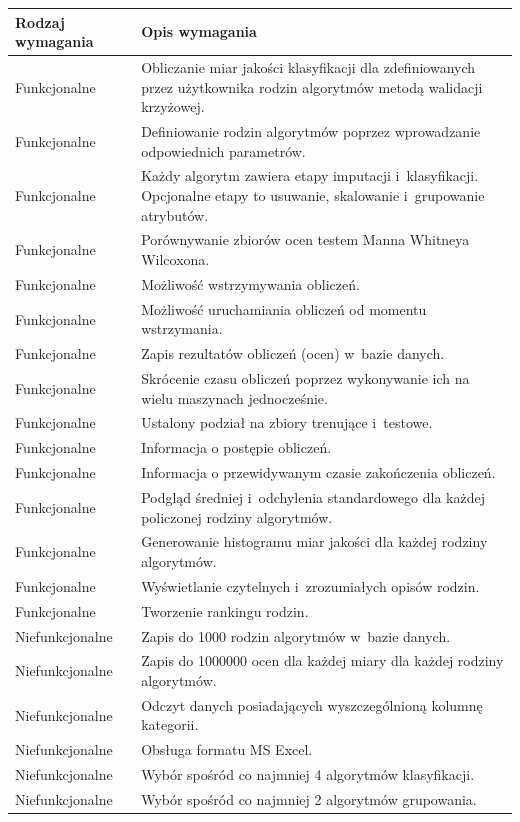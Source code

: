 \documentclass[../thesis.tex]{subfiles}
\begin{document}
\begin{table}[h]
\begin{center}
\begin{tabular}{ | l | p{110mm} | }
\hline
\rowcolor{lightgray} Rodzaj wymagania & Opis wymagania \\\hline

Funkcjonalne & Obliczanie miar jakości klasyfikacji dla zdefiniowanych przez użytkownika rodzin algorytmów metodą walidacji krzyżowej. \\\hline
Funkcjonalne & Definiowanie rodzin algorytmów poprzez wprowadzanie odpowiednich parametrów. \\\hline
Funkcjonalne & Każdy algorytm zawiera etapy imputacji i~klasyfikacji. Opcjonalne etapy to usuwanie, skalowanie i~grupowanie atrybutów. \\\hline
Funkcjonalne & Porównywanie zbiorów ocen testem Manna Whitneya Wilcoxona. \\\hline
Funkcjonalne & Możliwość wstrzymywania obliczeń. \\\hline
Funkcjonalne & Możliwość uruchamiania obliczeń od momentu wstrzymania. \\\hline
Funkcjonalne & Zapis rezultatów obliczeń (ocen) w~bazie danych. \\\hline
Funkcjonalne & Skrócenie czasu obliczeń poprzez wykonywanie ich na wielu maszynach jednocześnie. \\\hline
Funkcjonalne & Ustalony podział na zbiory trenujące i~testowe. \\\hline
Funkcjonalne & Informacja o postępie obliczeń. \\\hline
Funkcjonalne & Informacja o przewidywanym czasie zakończenia obliczeń. \\\hline
Funkcjonalne & Podgląd średniej i~odchylenia standardowego dla każdej policzonej rodziny algorytmów. \\\hline
Funkcjonalne & Generowanie histogramu miar jakości dla każdej rodziny algorytmów. \\\hline
Funkcjonalne & Wyświetlanie czytelnych i~zrozumiałych opisów rodzin. \\\hline
Funkcjonalne & Tworzenie rankingu rodzin. \\\hline

Niefunkcjonalne & Zapis do 1000 rodzin algorytmów w~bazie danych. \\\hline
Niefunkcjonalne & Zapis do 1000000 ocen dla każdej miary dla każdej rodziny algorytmów. \\\hline
Niefunkcjonalne & Odczyt danych posiadających wyszczególnioną kolumnę kategorii. \\\hline 
Niefunkcjonalne & Obsługa formatu MS Excel. \\\hline
Niefunkcjonalne & Wybór spośród co najmniej 4 algorytmów klasyfikacji. \\\hline 
Niefunkcjonalne & Wybór spośród co najmniej 2 algorytmów grupowania.\\\hline


\end{tabular}
\end{center}
\end{table}
\end{document}

